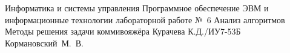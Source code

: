 \documentclass{bmstu}[a4paper]
\begin{document}
	
	\makereporttitle
	{Информатика и системы управления}
	{Программное обеспечение ЭВМ и информационные технологии}
	{лабораторной работе №~6}
	{Анализ алгоритмов}
	{Методы решения задачи коммивояжёра}
	{}
	{Курачева К.Д./ИУ7-53Б}
	{Кормановский~М.~В.}
	
	\maketableofcontents
	
	
	
	
	
	
	
	
	\makebibliography
	
	
	
	
\end{document}
